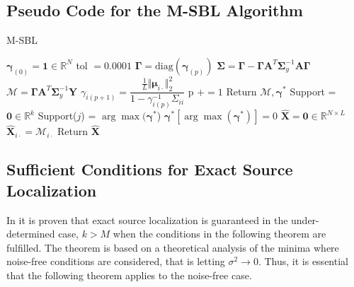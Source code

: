 \subsection{Pseudo Code for the M-SBL Algorithm}
\begin{algorithm}[H]
\caption{M-SBL}
\begin{algorithmic}[1]
\State $\boldsymbol{\gamma}_{(0)} = \mathbf{1} \in \mathbb{R}^N$
\State tol $=0.0001$
	\State $\boldsymbol{\Gamma} = \text{diag}(\boldsymbol{\gamma}_{(p)})$
	\State $\boldsymbol{\Sigma} = \boldsymbol{\Gamma} - \boldsymbol{\Gamma} \mathbf{A}^T \boldsymbol{\Sigma}_y^{-1} \mathbf{A} \boldsymbol{\Gamma}$
	\State $\mathcal{M} = \boldsymbol{\Gamma} \mathbf{A}^T \boldsymbol{\Sigma}_y^{-1} \mathbf{Y}$
		\State $\gamma_{i(p+1)} = \dfrac{\frac{1}{L} \Vert \boldsymbol{\mu}_{i \cdot} \Vert_2^2}{1 - \gamma_{i(p)}^{-1} \Sigma_{ii}}$
	\EndFor
	\State p $+= 1$
\EndWhile
\State Return $\mathcal{M}, \boldsymbol{\gamma}^{\ast}$
\EndProcedure
{}
\State Support = $\mathbf{0} \in \mathbb{R}^{k}$
		\State Support($j$) = $\arg \max (\boldsymbol{\gamma}^{\ast}$)
		\State $\boldsymbol{\gamma}^{\ast}\left[ \arg \max (\boldsymbol{\gamma}^{\ast})\right] = 0$
	\EndIf
\EndFor
\State $\hat{\mathbf{X}} = \mathbf{0} \in \mathbb{R}^{N \times L}$
	\State $\hat{\mathbf{X}}_{i\cdot} = \mathcal{M}_{i\cdot}$
\EndFor
\State Return $\hat{\mathbf{X}}$
\EndProcedure
\end{algorithmic}
\end{algorithm}

\subsection{Sufficient Conditions for Exact Source Localization}
In \cite{Balkan2014} it is proven that exact source localization is guaranteed in the under-determined case, $k > M$ when the conditions in the following theorem are fulfilled.
The theorem is based on a theoretical analysis of the minima where noise-free conditions are considered, that is letting $\sigma^2 \rightarrow 0$. Thus, it is essential that the following theorem applies to the noise-free case. 

